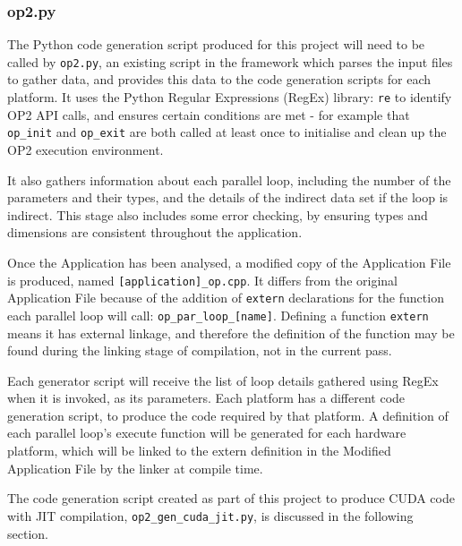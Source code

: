 \subsubsection{op2.py}
\label{ss:impl_op2}
The Python code generation script produced for this project will need to be called by \verb|op2.py|, an existing script in the framework which parses the input files to gather data, and provides this data to the code generation scripts for each platform. It uses the Python Regular Expressions (RegEx) library: \verb|re| \cite{re} to identify OP2 API calls, and ensures certain conditions are met - for example that \verb|op_init| and \verb|op_exit| are both called at least once to initialise and clean up the OP2 execution environment.
\par
It also gathers information about each parallel loop, including the number of the parameters and their types, and the details of the indirect data set if the loop is indirect. This stage also includes some error checking, by ensuring types and dimensions are consistent throughout the application.
\par
Once the Application has been analysed, a modified copy of the Application File is produced, named \verb|[application]_op.cpp|. It differs from the original Application File because of the addition of \verb|extern| declarations for the function each parallel loop will call: \verb|op_par_loop_[name]|. Defining a function \verb|extern| means it has external linkage, and therefore the definition of the function may be found during the linking stage of compilation, not in the current pass.
\par
Each generator script will receive the list of loop details gathered using RegEx  when it is invoked, as its parameters. Each platform has a different code generation script, to produce the code required by that platform. A definition of each parallel loop's execute function will be generated for each hardware platform, which will be linked to the extern definition in the Modified Application File by the linker at compile time.
\par
The code generation script created as part of this project to produce CUDA code with JIT compilation, \verb|op2_gen_cuda_jit.py|, is discussed in the following section.


